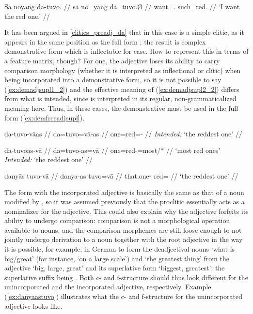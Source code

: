 \ex\label{ex:redone2}\begingl
	\gla Sa noyang da-tuvo. //
	\glb sa no=yang da=tuvo.Ø //
	\glc \PatT{} want=\Fsg{}.\Aarg{} such=red.\Top{} //
	\glft `I want the red one.' //
\endgl\xe

It has been argued in \autoref{clitics_preadj_da} that  in this
case is a simple clitic, as it appears in the same position as the full form
; the result is complex demonstrative form which is
inflectable for case. How to represent this in terms of a feature matrix,
though? For one, the adjective loses its ability to carry comparison morphology
(whether it is interpreted as inflectional or clitic) when being incorporated
into a demonstrative form, so it is not possible to say
(\ref{ex:demadjsupl1_2}) and the effective meaning of (\ref{ex:demadjsupl2_2})
differs from what is intended, since  is interpreted in its
regular, non-grammaticalized meaning here. Thus, in these cases, the
demonstrative must be used in the full form (\ref{ex:demfreeadjsupl}).

\pex
\a\label{ex:demadjsupl1_2}\ljudge*\begingl
	\gla da-tuvo-vāas //
	\glb da=tuvo=vā-as //
	\glc one=red=\Supl{}-\Parg{} //
	\glft \textit{Intended:} `the reddest one' //
\endgl

\a\label{ex:demadjsupl2_2}\ljudge\excl\begingl
	\gla da-tuvoas-vā //
	\glb da=tuvo-as=vā //
	\glc one=red-\Parg{}=most/*\Supl{} //
	\glft `most red ones' \\
		\textit{Intended:} `the reddest one' //
\endgl

\a\label{ex:demfreeadjsupl}\begingl
	\gla danyās tuvo-vā //
	\glb danya-as tuvo=vā //
	\glc that.one-\Parg{} red=\Supl{} //
	\glft `the reddest one' //
\endgl
\xe

The form with the incorporated adjective is basically the same as that of a
noun modified by , so it was assumed previously that the
proclitic essentially acts as a nominalizer for the adjective. This could also
explain why the adjective forfeits its ability to undergo comparison:
comparison is not a morphological operation available to nouns, and the
comparison morphemes are still loose enough to not jointly undergo derivation
to a noun together with the root adjective in the way it is possible, for
example, in German to form the deadjectival nouns  `what is
big/great' (for instance,  `on a large scale') and  `the greatest thing' from the adjective  `big, large, great'
and its superlative form  `biggest, greatest'; the superlative
suffix being . Both c- and f-structure should thus look different
for the unincorporated and the incorporated adjective, respectively. Example
(\ref{ex:danyaastuvo}) illustrates what the c- and f-structure for the
unincorporated adjective looks like.

